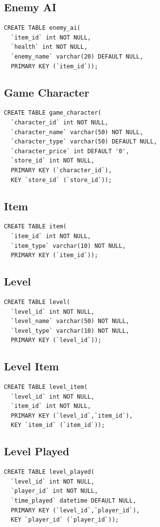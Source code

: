\documentclass[12pt]{report}
\begin{document}
\subsection{Enemy AI}
\begin{verbatim}
CREATE TABLE enemy_ai(
  `item_id` int NOT NULL,
  `health` int NOT NULL,
  `enemy_name` varchar(20) DEFAULT NULL,
  PRIMARY KEY (`item_id`));
\end{verbatim}

\subsection{Game Character}
\begin{verbatim}
CREATE TABLE game_character(
  `character_id` int NOT NULL,
  `character_name` varchar(50) NOT NULL,
  `character_type` varchar(50) DEFAULT NULL,
  `character_price` int DEFAULT '0',
  `store_id` int NOT NULL,
  PRIMARY KEY (`character_id`),
  KEY `store_id` (`store_id`));
\end{verbatim}

\subsection{Item}
\begin{verbatim}
CREATE TABLE item(
  `item_id` int NOT NULL,
  `item_type` varchar(10) NOT NULL,
  PRIMARY KEY (`item_id`));
\end{verbatim}

\subsection{Level}
\begin{verbatim}
CREATE TABLE level(
  `level_id` int NOT NULL,
  `level_name` varchar(50) NOT NULL,
  `level_type` varchar(10) NOT NULL,
  PRIMARY KEY (`level_id`));
\end{verbatim}

\subsection{Level Item}
\begin{verbatim}
CREATE TABLE level_item(
  `level_id` int NOT NULL,
  `item_id` int NOT NULL,
  PRIMARY KEY (`level_id`,`item_id`),
  KEY `item_id` (`item_id`));
\end{verbatim}

\subsection{Level Played}
\begin{verbatim}
CREATE TABLE level_played(
  `level_id` int NOT NULL,
  `player_id` int NOT NULL,
  `time_played` datetime DEFAULT NULL,
  PRIMARY KEY (`level_id`,`player_id`),
  KEY `player_id` (`player_id`));
\end{verbatim}
\end{document}
